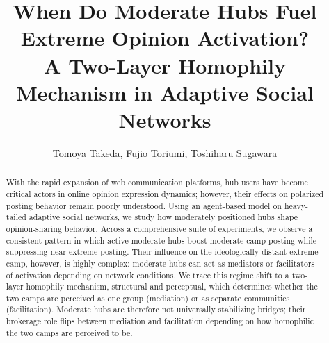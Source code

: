 \documentclass{svproc}
\def\Blue{\color[rgb]{0,0,1}}
\def\Black{\color[rgb]{0,0,0}}
\begin{document}
\mainmatter

\title{When Do Moderate Hubs Fuel Extreme Opinion Activation? \\ A Two-Layer Homophily Mechanism in Adaptive Social Networks}

\author{Tomoya Takeda, Fujio Toriumi, Toshiharu Sugawara}


\maketitle

\begin{abstract}\Blue
With the rapid expansion of web communication platforms, hub users
have become critical actors in online opinion expression dynamics;
however, their effects on polarized posting behavior remain poorly
understood. Using an agent-based model on heavy-tailed adaptive social
networks, we study how moderately positioned hubs shape
opinion-sharing behavior. Across a comprehensive suite of experiments,
we observe a consistent pattern in which active moderate hubs boost
moderate-camp posting while suppressing near-extreme posting. Their
influence on the ideologically distant extreme camp, however, is
highly complex: moderate hubs can act as mediators or facilitators of
activation depending on network conditions. We trace this regime shift
to a two-layer homophily mechanism, structural and perceptual, which
determines whether the two camps are perceived as one group
(mediation) or as separate communities (facilitation). Moderate hubs
are therefore not universally stabilizing bridges; their brokerage
role flips between mediation and facilitation depending on how
homophilic the two camps are perceived to be.
\Black
{} 
\end{abstract}
\end{document}
